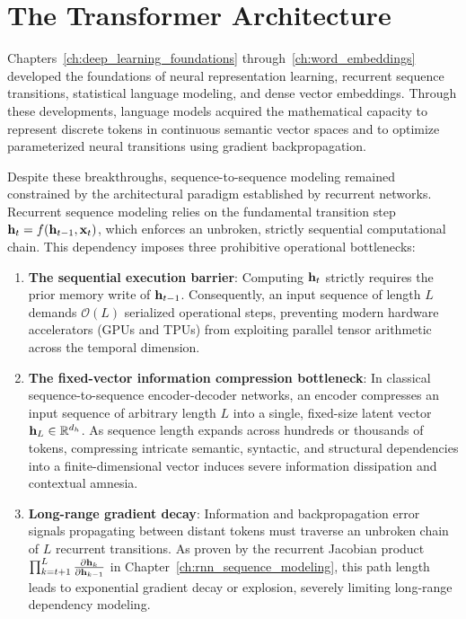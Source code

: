\documentclass[../../../main.tex]{subfiles}
\begin{document}
\chapter{The Transformer Architecture}
\label{ch:transformer_architecture}

Chapters~\ref{ch:deep_learning_foundations} through~\ref{ch:word_embeddings} developed the foundations of neural representation learning, recurrent sequence transitions, statistical language modeling, and dense vector embeddings. Through these developments, language models acquired the mathematical capacity to represent discrete tokens in continuous semantic vector spaces and to optimize parameterized neural transitions using gradient backpropagation.

Despite these breakthroughs, sequence-to-sequence modeling remained constrained by the architectural paradigm established by recurrent networks. Recurrent sequence modeling relies on the fundamental transition step $\mathbf{h}_t = f(\mathbf{h}_{t-1}, \mathbf{x}_t)$, which enforces an unbroken, strictly sequential computational chain. This dependency imposes three prohibitive operational bottlenecks:
\begin{enumerate}
    \item \textbf{The sequential execution barrier}: Computing $\mathbf{h}_t$ strictly requires the prior memory write of $\mathbf{h}_{t-1}$. Consequently, an input sequence of length $L$ demands $\mathcal{O}(L)$ serialized operational steps, preventing modern hardware accelerators (GPUs and TPUs) from exploiting parallel tensor arithmetic across the temporal dimension.
    \item \textbf{The fixed-vector information compression bottleneck}: In classical sequence-to-sequence encoder-decoder networks, an encoder compresses an input sequence of arbitrary length $L$ into a single, fixed-size latent vector $\mathbf{h}_L \in \mathbb{R}^{d_h}$. As sequence length expands across hundreds or thousands of tokens, compressing intricate semantic, syntactic, and structural dependencies into a finite-dimensional vector induces severe information dissipation and contextual amnesia.
    \item \textbf{Long-range gradient decay}: Information and backpropagation error signals propagating between distant tokens must traverse an unbroken chain of $L$ recurrent transitions. As proven by the recurrent Jacobian product $\prod_{k=t+1}^L \frac{\partial \mathbf{h}_k}{\partial \mathbf{h}_{k-1}}$ in Chapter~\ref{ch:rnn_sequence_modeling}, this path length leads to exponential gradient decay or explosion, severely limiting long-range dependency modeling.
\end{enumerate}
\end{document}
